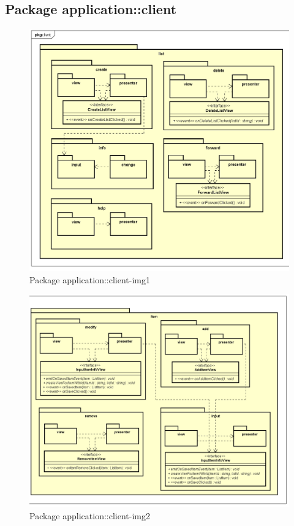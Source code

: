 \subsection{Package application::client}
\label{Package application::client}
\begin{figure}[H]
	\centering
	\includegraphics[scale=0.6]{Sezioni/Packages/App/pck_client1.png}
	\caption{Package application::client-img1}
\end{figure}

\label{Package application::client}
\begin{figure}[H]
	\centering
	\includegraphics[scale=0.6]{Sezioni/Packages/App/pck_client2.png}
	\caption{Package application::client-img2}
\end{figure}

